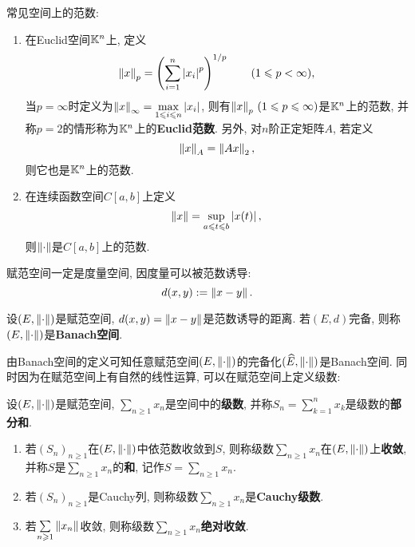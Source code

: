 \begin{Example}
	常见空间上的范数:

	\begin{enumerate}[(1)]
		\item 在Euclid空间$ \mathbb{K}^n $上, 定义
		      \[
			      \left\| x \right\|_p=\left(\sum_{i=1}^n\left| x_i \right| ^p\right)^{1/p}\qquad(1\leqslant p<\infty),
		      \]
		      当$ p=\infty $时定义为$ \left\| x \right\|_\infty=\max\limits_{1\leqslant i\leqslant n}\left| x_i \right|  $, 则有$ \left\| x \right\|_p\,(1\leqslant p\leqslant\infty) $是$ \mathbb{K}^n $上的范数, 并称$ p=2 $的情形称为$ \mathbb{K}^n $上的\textbf{Euclid范数}. 另外, 对$ n $阶正定矩阵$ A $, 若定义
		      \[
			      \left\| x \right\|_A=\left\| Ax \right\|_2,
		      \]
		      则它也是$ \mathbb{K}^n $上的范数.

		\item 在连续函数空间$ C[a,b] $上定义
		      \[
			      \left\| x \right\|=\sup_{a\leqslant t\leqslant b}\left| x(t) \right| ,
		      \]
		      则$ \left\| \cdot \right\| $是$ C[a,b] $上的范数.
	\end{enumerate}

\end{Example}

\begin{Remark}
	赋范空间一定是度量空间, 因度量可以被范数诱导:
	\[
		d(x,y):=\left\| x-y \right\|.
	\]
\end{Remark}

\begin{Definition}[Banach空间]\label{def:Banach空间}
	设$ (E,\left\| \cdot \right\|) $是赋范空间, $ d(x,y)=\left\| x-y \right\| $是范数诱导的距离. 若$ (E,d) $完备, 则称$ (E,\left\| \cdot \right\|) $是\textbf{Banach空间}.
\end{Definition}

由Banach空间的定义可知任意赋范空间$ (E,\left\| \cdot \right\|) $的完备化$ (\widehat{E},\left\| \cdot \right\|) $是Banach空间. 同时因为在赋范空间上有自然的线性运算, 可以在赋范空间上定义级数:

\begin{Definition}[级数]\label{def:级数}
	设$ (E,\left\| \cdot \right\|) $是赋范空间, $ \sum\limits_{n\geqslant 1}x_n $是空间中的\textbf{级数}, 并称$ S_n=\sum\limits_{k=1}^nx_k $是级数的\textbf{部分和}.

	\begin{enumerate}[(1)]
		\item 若$ (S_n)_{n\geqslant 1} $在$ (E,\left\| \cdot \right\|) $中依范数收敛到$ S $, 则称级数$ \sum\limits_{n\geqslant 1}x_n $在$ (E,\left\| \cdot \right\|) $上\textbf{收敛}, 并称$ S $是$ \sum\limits_{n\geqslant 1}x_n $的\textbf{和}, 记作$ S=\sum\limits_{n\geqslant 1}x_n $.

		\item 若$ (S_n)_{n\geqslant 1} $是Cauchy列, 则称级数$ \sum\limits_{n\geqslant 1}x_n $是\textbf{Cauchy级数}.

		\item 若$ \sum\limits_{n\geqslant 1}\left\| x_n \right\| $收敛, 则称级数$ \sum\limits_{n\geqslant 1}x_n $\textbf{绝对收敛}.
	\end{enumerate}
\end{Definition}


